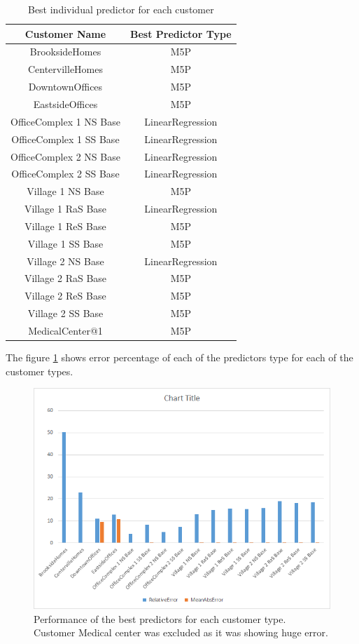 \begin{table}[h!]
\centering
\begin{tabular}{|c| c|} 
 \hline
 Customer Name & Best Predictor Type \\ [0.5ex] 
 \hline
BrooksideHomes &	M5P \\
CentervilleHomes &	M5P \\
DowntownOffices &	M5P \\
EastsideOffices &	M5P \\
OfficeComplex 1 NS Base &	LinearRegression \\
OfficeComplex 1 SS Base &	LinearRegression \\
OfficeComplex 2 NS Base &	LinearRegression \\
OfficeComplex 2 SS Base &	LinearRegression \\
Village 1 NS Base &	M5P \\
Village 1 RaS Base &	LinearRegression \\
Village 1 ReS Base &	M5P \\
Village 1 SS Base &	M5P \\
Village 2 NS Base &	LinearRegression \\
Village 2 RaS Base &	M5P \\
Village 2 ReS Base &	M5P \\
Village 2 SS Base &	M5P \\
MedicalCenter@1	& M5P \\ [1ex] 
 \hline
\end{tabular}
\caption{Best individual predictor for each customer}
\label{table:1}
\end{table}

The figure \ref{fig:indiv-cutomer-best-predictor-error} shows error percentage of each of the predictors type for each of the customer types.

\begin{figure}[h!]
  \includegraphics[width=\linewidth]{indiv-cutomer-best-predictor-error.png}
  \caption{Performance of the best predictors for each customer type. Customer Medical center was excluded as it was showing huge error. }
  \label{fig:indiv-cutomer-best-predictor-error}
\end{figure}

